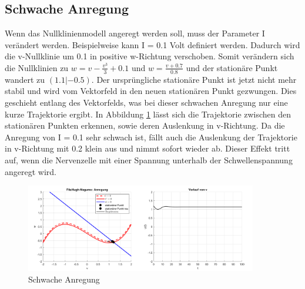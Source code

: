 \begin{refsection}
\subsection{Schwache Anregung}
Wenn das Nullklinienmodell angeregt werden soll, muss der Parameter I verändert werden.
Beispielweise kann I = 0.1 Volt definiert werden.
Dadurch wird die v-Nullklinie um 0.1 in positive w-Richtung verschoben.
Somit verändern sich die Nullklinien zu \( w = v - \frac{v^3}{3} + 0.1\)
und \(w = \frac{v + 0.7}{0.8}\) und der stationäre Punkt wandert zu \((1.1 |-0.5)\).
Der ursprüngliche stationäre Punkt ist jetzt nicht mehr stabil und wird vom Vektorfeld in den neuen stationären Punkt
gezwungen.
Dies geschieht entlang des Vektorfelds, was bei dieser schwachen Anregung nur eine kurze Trajektorie ergibt.
In Abbildung \ref{fig:schwacheAnregung} lässt sich die Trajektorie zwischen den stationären Punkten erkennen, sowie
deren Auslenkung in v-Richtung.
Da die Anregung von I = 0.1 sehr schwach ist, fällt auch die Auslenkung der Trajektorie in v-Richtung mit 0.2 klein aus und
nimmt sofort wieder ab. 
Dieser Effekt tritt auf, wenn die Nervenzelle mit einer Spannung unterhalb der Schwellenspannung angeregt wird.
\begin{figure}[H]
    \centering
    \includegraphics[width=0.9\textwidth]{papers/nerven/Bilder/schwacheAnregung.png}
    \caption{Schwache Anregung}
    \label{fig:schwacheAnregung}
\end{figure}

\end{refsection}
